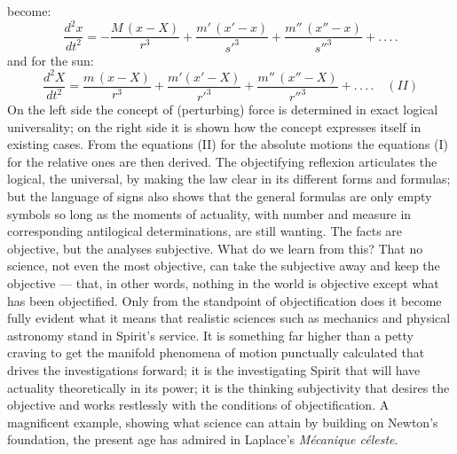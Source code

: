 \documentclass[12pt,a4paper]{book}
\begin{document}
{become:
\[
\frac{d^{2}x}{dt^{2}} = - \frac{M\,(x - X)}{r^{3}}
  + \frac{m'\,(x' - x)}{{s'}^{3}}
  + \frac{m''\,(x'' - x)}{{s''}^{3}} + .\,.\,.\,.
\]
and for the sun:
\[
\frac{d^{2}X}{dt^{2}} = \frac{m\,(x - X)}{r^{3}}
  + \frac{m'(x' - X)}{{r'}^{3}}
  + \frac{m''\,(x'' - X)}{{r''}^{3}} + .\,.\,.\,. \quad (II)
\]
On the left side the concept of (perturbing) force is determined in exact logical universality; on the
right side it is shown how the concept expresses itself in existing cases. From the equations (II) for the
absolute motions the equations (I) for the relative ones are then derived. The objectifying reflexion
articulates the logical, the universal, by making the law clear in its different forms and formulas; but
the language of signs also shows that the general formulas are only empty symbols so long as the moments
of actuality, with number and measure in corresponding antilogical determinations, are still wanting. The
facts are objective, but the analyses subjective. What do we learn from this? That no science, not even
the most objective, can take the subjective away and keep the objective --- that, in other words, nothing
in the world is objective except what has been objectified.}
Only from the standpoint of objectification
does it become fully evident what it means that realistic sciences such as mechanics and physical astronomy
stand in Spirit's service. It is something far higher than a petty craving to get the manifold phenomena of
motion punctually calculated that drives the investigations forward; it is the investigating Spirit that
will have actuality theoretically in its power; it is the thinking subjectivity that desires the objective
and works restlessly with the conditions of objectification. A magnificent example, showing what
science can attain by building on Newton's foundation, the present age has admired in Laplace's
\textit{Mécanique céleste}.
\end{document}

